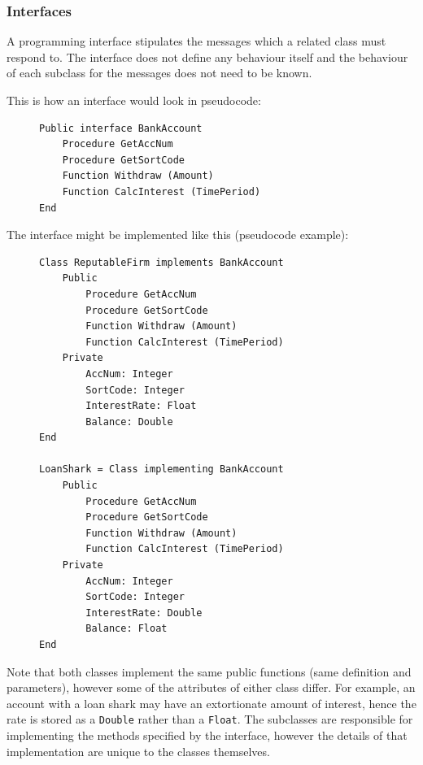 \documentclass[10pt]{article}
\begin{document}
\subsubsection{Interfaces}
\label{sec:org7d57bc7}

A programming interface stipulates the messages which a related class must respond to. The interface does not define any behaviour itself and the behaviour of each subclass for the messages does not need to be known.

This is how an interface would look in pseudocode:

\begin{figure}[H]
\begin{verbatim}
Public interface BankAccount
    Procedure GetAccNum
    Procedure GetSortCode
    Function Withdraw (Amount)
    Function CalcInterest (TimePeriod)
End
\end{verbatim}
\end{figure}

The interface might be implemented like this (pseudocode example):

\begin{figure}[H]
\begin{verbatim}
Class ReputableFirm implements BankAccount
    Public
        Procedure GetAccNum
        Procedure GetSortCode
        Function Withdraw (Amount)
        Function CalcInterest (TimePeriod)
    Private
        AccNum: Integer
        SortCode: Integer
        InterestRate: Float
        Balance: Double
End

LoanShark = Class implementing BankAccount
    Public
        Procedure GetAccNum
        Procedure GetSortCode
        Function Withdraw (Amount)
        Function CalcInterest (TimePeriod)
    Private
        AccNum: Integer
        SortCode: Integer
        InterestRate: Double
        Balance: Float
End
\end{verbatim}
\end{figure}

Note that both classes implement the same public functions (same definition and parameters), however some of the attributes of either class differ. For example, an account with a loan shark may have an extortionate amount of interest, hence the rate is stored as a \texttt{Double} rather than a \texttt{Float}. The subclasses are responsible for implementing the methods specified by the interface, however the details of that implementation are unique to the classes themselves.
\end{document}
